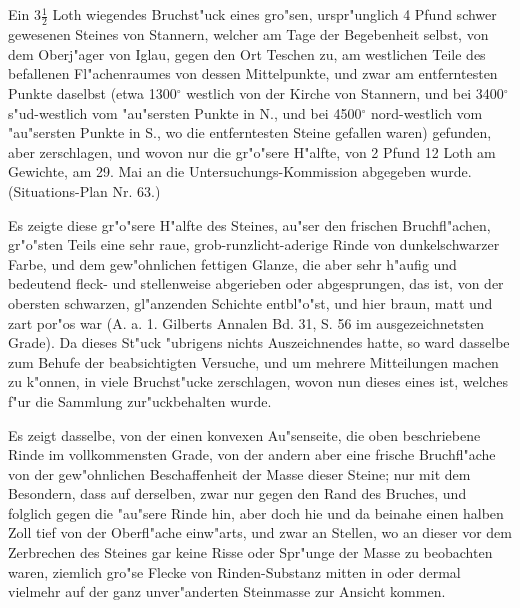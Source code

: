 \documentclass[a4paper, 11pt, oneside, german]{article}
\begin{document}
\subsection{}
\paragraph{}
Ein $3\frac{1}{2}$ Loth wiegendes Bruchst"uck eines gro"sen, urspr"unglich 4 Pfund schwer gewesenen Steines von Stannern, welcher am Tage der Begebenheit selbst, von dem Oberj"ager von Iglau, gegen den Ort Teschen zu, am westlichen Teile des befallenen Fl"achenraumes von dessen Mittelpunkte, und zwar am entferntesten Punkte daselbst (etwa 1300$^{\circ}$ westlich von der Kirche von Stannern, und bei 3400$^{\circ}$ s"ud-westlich vom "au"sersten Punkte in N., und bei 4500$^{\circ}$ nord-westlich vom "au"sersten Punkte in S., wo die entferntesten Steine gefallen waren) gefunden, aber zerschlagen, und wovon nur die gr"o"sere H"alfte, von 2 Pfund 12 Loth am Gewichte, am 29. Mai an die Untersuchungs-Kommission abgegeben wurde. (Situations-Plan Nr. 63.)

Es zeigte diese gr"o"sere H"alfte des Steines, au"ser den frischen Bruchfl"achen, gr"o"sten Teils eine sehr raue, grob-runzlicht-aderige Rinde von dunkelschwarzer Farbe, und dem gew"ohnlichen fettigen Glanze, die aber sehr h"aufig und bedeutend fleck- und stellenweise abgerieben oder abgesprungen, das ist, von der obersten schwarzen, gl"anzenden Schichte entbl"o"st, und hier braun, matt und zart por"os war (A. a. 1. Gilberts Annalen Bd. 31, S. 56 im ausgezeichnetsten Grade). Da dieses St"uck "ubrigens nichts Auszeichnendes hatte, so ward dasselbe zum Behufe der beabsichtigten Versuche, und um mehrere Mitteilungen machen zu k"onnen, in viele Bruchst"ucke zerschlagen, wovon nun dieses eines ist, welches f"ur die Sammlung zur"uckbehalten wurde.

Es zeigt dasselbe, von der einen konvexen Au"senseite, die oben beschriebene Rinde im vollkommensten Grade, von der andern aber eine frische Bruchfl"ache von der gew"ohnlichen Beschaffenheit der Masse dieser Steine; nur mit dem Besondern, dass auf derselben, zwar nur gegen den Rand des Bruches, und folglich gegen die "au"sere Rinde hin, aber doch hie und da beinahe einen halben Zoll tief von der Oberfl"ache einw"arts, und zwar an Stellen, wo an dieser vor dem Zerbrechen des Steines gar keine Risse oder Spr"unge der Masse zu beobachten waren, ziemlich gro"se Flecke von Rinden-Substanz mitten in oder dermal vielmehr auf der ganz unver"anderten Steinmasse zur Ansicht kommen.
\end{document}
